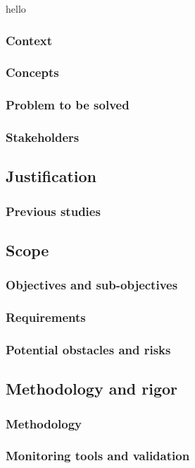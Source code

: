 hello

\subsubsection{Context}
\subsubsection{Concepts}
\subsubsection{Problem to be solved}
\subsubsection{Stakeholders}

\subsection{Justification}
\subsubsection{Previous studies}

\subsection{Scope}
\subsubsection{Objectives and sub-objectives}
\subsubsection{Requirements}
\subsubsection{Potential obstacles and risks}

\subsection{Methodology and rigor}

\subsubsection{Methodology}

\subsubsection{Monitoring tools and validation}
